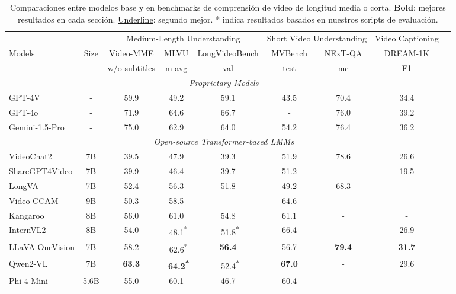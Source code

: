 \begin{table}[!t]
\centering
\small
\caption{Comparaciones entre modelos base y \model en benchmarks de comprensión de video de longitud media o corta. \textbf{Bold}: mejores resultados en cada sección. \uline{Underline}: segundo mejor. * indica resultados basados en nuestros scripts de evaluación.}
\begin{tabular}{lcccccccc}
\toprule
& & \multicolumn{3}{c}{Medium-Length Understanding} & \multicolumn{2}{c}{Short Video Understanding} & Video Captioning \\ \cmidrule(l){3-8} 
Models & Size & Video-MME & MLVU & {LongVideoBench} & MVBench & {NExT-QA} & DREAM-1K \\ \cmidrule(l){3-8} 
& & w/o subtitles & m-avg & {val} & test & {mc} & F1 \\ \midrule
\multicolumn{8}{c}{\cellcolor[HTML]{EFEFEF}\textit{Proprietary Models}} \\
GPT-4V \cite{achiam2023gpt} & - & 59.9 & 49.2 & {59.1} & 43.5 & 70.4 & 34.4 \\
GPT-4o \cite{OpenAI_GPT4o} & - & 71.9 & 64.6 & {66.7} & - & {76.0} & 39.2 \\
Gemini-1.5-Pro \cite{team2024gemini} & - & 75.0 & 62.9 & {64.0} & 54.2 & 76.4 & 36.2 \\ \midrule
\multicolumn{8}{c}{\cellcolor[HTML]{EFEFEF}\textit{Open-source Transformer-based LMMs}} \\
VideoChat2 \cite{li2024mvbench} & 7B & 39.5 & 47.9 & {39.3} & 51.9 & {78.6} & 26.6 \\
ShareGPT4Video \cite{chen2025sharegpt4video} & 7B & 39.9 & 46.4 & {39.7} & 51.2 & - & 19.5 \\
LongVA \cite{zhang2024long} & 7B & 52.4 & 56.3 & {51.8} & 49.2 & {68.3} & - \\
Video-CCAM \cite{fei2024video} & 9B & 50.3 & 58.5 & - & 64.6 & - & - \\
Kangaroo \cite{liu2024kangaroo} & 8B & 56.0 & 61.0 & {54.8} & 61.1 & - & - \\
InternVL2 \cite{chen2024internvl} & 8B & 54.0 & ~48.1\textsuperscript{*} & ~51.8\textsuperscript{*} & 66.4 & - & 26.9 \\
LLaVA-OneVision \cite{li2024llavaov} & 7B & 58.2 & ~62.6\textsuperscript{*} & \textbf{56.4} & 56.7 & \textbf{79.4} & \textbf{31.7} \\
Qwen2-VL \cite{wang2024qwen2} & 7B & \textbf{63.3} & \textbf{~64.2\textsuperscript{*}} & ~52.4\textsuperscript{*} & \textbf{67.0} & - & 29.6 \\
Phi-4-Mini \cite{abouelenin2025phi4minitechnicalreportcompact} & 5.6B & 55.0  & 60.1  & 46.7 & 60.4 & - & -\\

\end{tabular}
\end{table}
